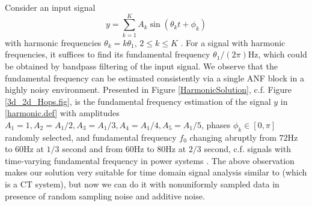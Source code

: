 \documentclass{UCF_ETD}
\begin{document}
Consider an input signal
\begin{equation}\label{harmonic.def}
y=\sum_{k=1}^K A_k\sin (\theta_k t+\phi_k)\end{equation}
with harmonic frequencies
$
\theta_k=k\theta_1$, $2\le k\le K $ \cite{abbas13}.
 For a signal with harmonic frequencies, it suffices to find its
 fundamental frequency $\theta_1/(2\pi)$Hz, which could be obtained by
 bandpass filtering of the input signal.
 We observe that the fundamental frequency can be estimated consistently via  a single ANF block
 in a highly noisy environment.
 Presented in  Figure \ref{HarmonicSolution},  c.f. Figure
 \ref{3d_2d_Hops.fig},
 is the fundamental frequency  estimation of the signal $y$ in \eqref{harmonic.def}
with  amplitudes $A_1=1, A_2=A_1/2, A_3=A_1/3, A_4=A_1/4, A_5=A_1/5$,
phases $\phi_k\in [0, \pi]$ randomly selected,
and fundamental frequency $f_0$
 changing abruptly from
$72$Hz to $60$Hz at $1/3$ second and from $60$Hz to $80$Hz at $2/3$ second, c.f.
 signals  with time-varying fundamental frequency
 in power systems \cite{abbas13}. The above observation makes our solution very suitable for time domain signal analysis similar to \cite{mojiri07c} (which is a CT system), but now we can do it with nonuniformly sampled data in presence of random sampling noise and additive noise.
 
\end{document}
